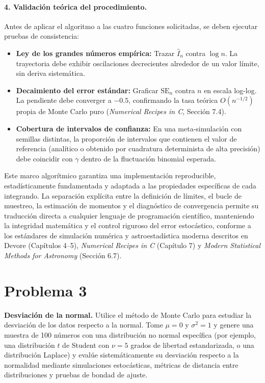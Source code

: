 \documentclass[12pt]{article}
\begin{document}
\paragraph{4. Validación teórica del procedimiento.}
Antes de aplicar el algoritmo a las cuatro funciones solicitadas, se deben ejecutar pruebas de consistencia:
\begin{itemize}
\item \textbf{Ley de los grandes números empírica:} Trazar $\hat{I}_n$ contra $\log n$. La trayectoria debe exhibir oscilaciones decrecientes alrededor de un valor límite, sin deriva sistemática.
\item \textbf{Decaimiento del error estándar:} Graficar $\text{SE}_n$ contra $n$ en escala log-log. La pendiente debe converger a $-0.5$, confirmando la tasa teórica $O(n^{-1/2})$ propia de Monte Carlo puro (\textit{Numerical Recipes in C}, Sección 7.4).
\item \textbf{Cobertura de intervalos de confianza:} En una meta-simulación con semillas distintas, la proporción de intervalos que contienen el valor de referencia (analítico o obtenido por cuadratura determinista de alta precisión) debe coincidir con $\gamma$ dentro de la fluctuación binomial esperada.
\end{itemize}
Este marco algorítmico garantiza una implementación reproducible, estadísticamente fundamentada y adaptada a las propiedades específicas de cada integrando. La separación explícita entre la definición de límites, el bucle de muestreo, la estimación de momentos y el diagnóstico de convergencia permite su traducción directa a cualquier lenguaje de programación científico, manteniendo la integridad matemática y el control riguroso del error estocástico, conforme a los estándares de simulación numérica y astroestadística moderna descritos en Devore (Capítulos 4--5), \textit{Numerical Recipes in C} (Capítulo 7) y \textit{Modern Statistical Methods for Astronomy} (Sección 6.7).

\section{Problema 3}
\textbf{Desviación de la normal.} Utilice el método de Monte Carlo para estudiar la desviación de los datos respecto a la normal. Tome $\mu = 0$ y $\sigma^2 = 1$ y genere una muestra de 100 números con una distribución no normal específica (por ejemplo, una distribución $t$ de Student con $\nu=5$ grados de libertad estandarizada, o una distribución Laplace) y evalúe sistemáticamente su desviación respecto a la normalidad mediante simulaciones estocásticas, métricas de distancia entre distribuciones y pruebas de bondad de ajuste.
\end{document}
